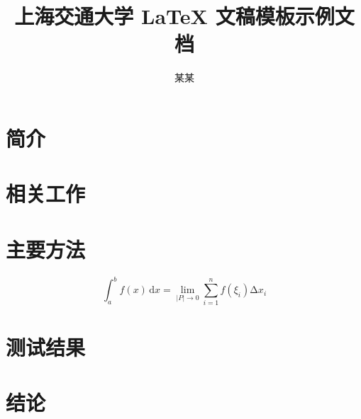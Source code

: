 \documentclass{sjtuarticle}
\title{上海交通大学 \LaTeX{} 文稿模板示例文档}
\author{某\quad{}某}
\begin{document}
\maketitle

\begin{abstract}
  \zhlipsum[1]
\end{abstract}

\section{简介}

\zhlipsum[2]

\section{相关工作}

\zhlipsum[3]

\section{主要方法}

\zhlipsum[4-5]

\begin{equation}
  \int_{a}^b f(x)\,\mathrm{d}x=\lim_{|P|\rightarrow 0}\sum_{i=1}^n f(\xi_i)\increment x_i
\end{equation}

\section{测试结果}

\zhlipsum[6]

\section{结论}

\zhlipsum[7]

\nocite{*}
\printbibliography[heading=bibintoc]
\end{document}
